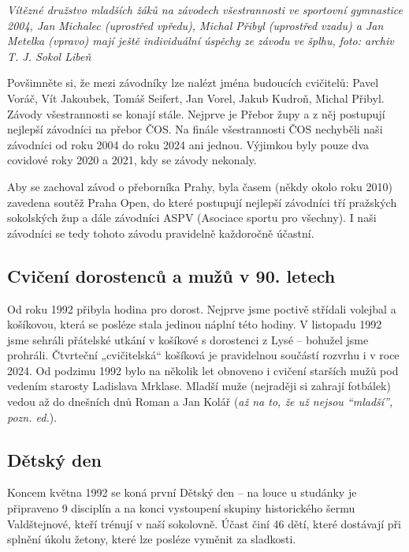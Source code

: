 \emph{Vítězné družstvo mladších žáků na závodech všestrannosti ve
sportovní gymnastice 2004, Jan Michalec (uprostřed vpředu), Michal
Přibyl (uprostřed vzadu) a Jan Metelka (vpravo) mají ještě individuální
úspěchy ze závodu ve šplhu,} \emph{foto: archiv T. J. Sokol Libeň}

Povšimněte si, že mezi závodníky lze nalézt jména budoucích cvičitelů:
Pavel Voráč, Vít Jakoubek, Tomáš Seifert, Jan Vorel, Jakub Kudroň,
Michal Přibyl. Závody všestrannosti se konají stále. Nejprve je Přebor
župy a z něj postupují nejlepší závodníci na přebor ČOS. Na finále
všestrannosti ČOS nechyběli naši závodníci od roku 2004 do roku 2024 ani
jednou. Výjimkou byly pouze dva covidové roky 2020 a 2021, kdy se závody
nekonaly.

Aby se zachoval závod o přeborníka Prahy, byla časem (někdy okolo roku
2010) zavedena soutěž Praha Open, do které postupují nejlepší závodníci
tří pražských sokolských žup a dále závodníci ASPV (Asociace sportu pro
všechny). I naši závodníci se tedy tohoto závodu pravidelně každoročně
účastní.

\subsection{Cvičení dorostenců a mužů v 90.
letech}\label{cviux10denuxed-dorostencux16f-a-muux17eux16f-v-90.-letech}

Od roku 1992 přibyla hodina pro dorost. Nejprve jsme poctivě střídali
volejbal a košíkovou, která se posléze stala jedinou náplní této hodiny.
V listopadu 1992 jsme sehráli přátelské utkání v košíkové s dorostenci z
Lysé -- bohužel jsme prohráli. Čtvrteční „cvičitelská`` košíková je
pravidelnou součástí rozvrhu i v roce 2024. Od podzimu 1992 bylo na
několik let obnoveno i cvičení starších mužů pod vedením starosty
Ladislava Mrklase. Mladší muže (nejraději si zahrají fotbálek) vedou až
do dnešních dnů Roman a Jan Kolář (\emph{až na to, že už nejsou
``mladší'', pozn. ed.}).

\subsection{Dětský den}\label{dux11btskuxfd-den}

Koncem května 1992 se koná první Dětský den -- na louce u studánky je
připraveno 9 disciplín a na konci vystoupení skupiny historického šermu
Valdštejnové, kteří trénují v naší sokolovně. Účast činí 46 dětí, které
dostávají při splnění úkolu žetony, které lze posléze vyměnit za
sladkosti.

